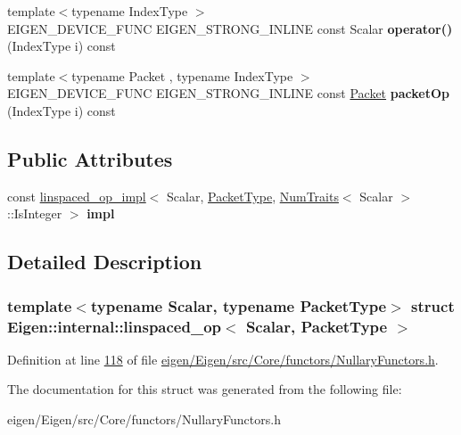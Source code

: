 \begin{DoxyCompactItemize}
\item 
\mbox{\label{struct_eigen_1_1internal_1_1linspaced__op_ab86424ad4c009092eb466fa98483ff5b}} 
{\footnotesize template$<$typename Index\+Type $>$ }\\E\+I\+G\+E\+N\+\_\+\+D\+E\+V\+I\+C\+E\+\_\+\+F\+U\+NC E\+I\+G\+E\+N\+\_\+\+S\+T\+R\+O\+N\+G\+\_\+\+I\+N\+L\+I\+NE const Scalar {\bfseries operator()} (Index\+Type i) const
\item 
\mbox{\label{struct_eigen_1_1internal_1_1linspaced__op_a217a0431792ac4ff26701b596bca99ce}} 
{\footnotesize template$<$typename Packet , typename Index\+Type $>$ }\\E\+I\+G\+E\+N\+\_\+\+D\+E\+V\+I\+C\+E\+\_\+\+F\+U\+NC E\+I\+G\+E\+N\+\_\+\+S\+T\+R\+O\+N\+G\+\_\+\+I\+N\+L\+I\+NE const \hyperlink{union_eigen_1_1internal_1_1_packet}{Packet} {\bfseries packet\+Op} (Index\+Type i) const
\end{DoxyCompactItemize}
\subsection*{Public Attributes}
\begin{DoxyCompactItemize}
\item 
\mbox{\label{struct_eigen_1_1internal_1_1linspaced__op_a138dcd1f8c8f8f7af23724399ddb0a4f}} 
const \hyperlink{struct_eigen_1_1internal_1_1linspaced__op__impl}{linspaced\+\_\+op\+\_\+impl}$<$ Scalar, \hyperlink{struct_eigen_1_1_packet_type}{Packet\+Type}, \hyperlink{group___core___module_struct_eigen_1_1_num_traits}{Num\+Traits}$<$ Scalar $>$\+::Is\+Integer $>$ {\bfseries impl}
\end{DoxyCompactItemize}


\subsection{Detailed Description}
\subsubsection*{template$<$typename Scalar, typename Packet\+Type$>$\newline
struct Eigen\+::internal\+::linspaced\+\_\+op$<$ Scalar, Packet\+Type $>$}



Definition at line \hyperlink{eigen_2_eigen_2src_2_core_2functors_2_nullary_functors_8h_source_l00118}{118} of file \hyperlink{eigen_2_eigen_2src_2_core_2functors_2_nullary_functors_8h_source}{eigen/\+Eigen/src/\+Core/functors/\+Nullary\+Functors.\+h}.



The documentation for this struct was generated from the following file\+:\begin{DoxyCompactItemize}
\item 
eigen/\+Eigen/src/\+Core/functors/\+Nullary\+Functors.\+h\end{DoxyCompactItemize}
